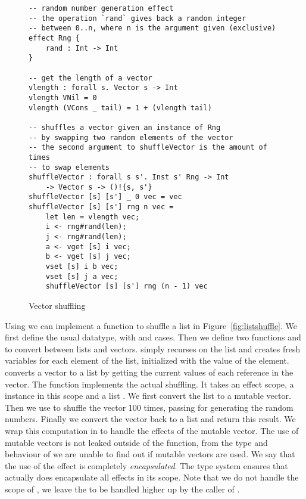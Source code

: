 \begin{figure}[H]
\caption{Vector shuffling}
\begin{verbatim}
-- random number generation effect
-- the operation `rand` gives back a random integer
-- between 0..n, where n is the argument given (exclusive)
effect Rng {
	rand : Int -> Int
}

-- get the length of a vector
vlength : forall s. Vector s -> Int
vlength VNil = 0
vlength (VCons _ tail) = 1 + (vlength tail)

-- shuffles a vector given an instance of Rng
-- by swapping two random elements of the vector
-- the second argument to shuffleVector is the amount of times
-- to swap elements
shuffleVector : forall s s'. Inst s' Rng -> Int
	-> Vector s -> ()!{s, s'}
shuffleVector [s] [s'] _ 0 vec = vec
shuffleVector [s] [s'] rng n vec =
	let len = vlength vec;
	i <- rng#rand(len);
	j <- rng#rand(len);
	a <- vget [s] i vec;
	b <- vget [s] j vec;
	vset [s] i b vec;
	vset [s] j a vec;
	shuffleVector [s] [s'] rng (n - 1) vec
\end{verbatim}
\label{fig:shuffle}
\end{figure}

Using  we can implement a function to shuffle a list in Figure~\ref{fig:listshuffle}.
We first define the usual  datatype, with  and  cases.
Then we define two functions  and  to convert between lists and vectors.
 simply recurses on the list and creates fresh variables for each element of the list, initialized with the value of the element.
 converts a vector to a list by getting the current values of each reference in the vector.
The function  implements the actual shuffling.
It takes an effect scope, a  instance  in this scope and a list .
We first convert the list to a mutable vector.
Then we use  to shuffle the vector 100 times, passing  for generating the random numbers.
Finally we convert the vector back to a list and return this result.
We wrap this computation in  to handle the effects of the mutable vector.
The use of mutable vectors is not leaked outside of the function, from the type and behaviour of  we are unable to find out if mutable vectors are used.
We say that the use of the  effect is completely \emph{encapsulated}.
The type system ensures that  actually does encapsulate all effects in its scope.
Note that we do not handle the scope of , we leave the  to be handled higher up by the caller of .


